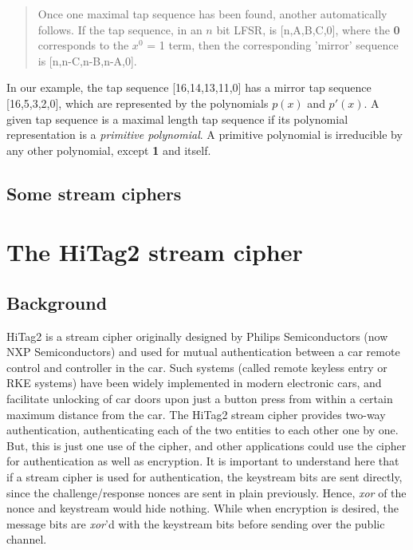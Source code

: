 \begin{quote}
Once one maximal tap sequence has been found, another automatically follows. If the tap sequence, in an $n$ bit LFSR, is [n,A,B,C,0], where the \textbf{0} corresponds to the $x^0$ = 1 term, then the corresponding 'mirror' sequence is [n,n-C,n-B,n-A,0].
\end{quote}

In our example, the tap sequence [16,14,13,11,0] has a mirror tap sequence [16,5,3,2,0], which are represented by the polynomials $p(x)$ and $p'(x)$. A given tap sequence is a maximal length tap sequence if its polynomial representation is a \emph{primitive polynomial}. A primitive polynomial is irreducible by any other polynomial, except \textbf{1} and itself. 

\subsection{Some stream ciphers}

\section{The HiTag2 stream cipher}
\label{sec:hitag2}

\subsection{Background}
\label{sec:hitag2-background}
HiTag2 is a stream cipher originally designed by Philips Semiconductors (now NXP Semiconductors) and used for mutual authentication between a car remote control and controller in the car. Such systems (called remote keyless entry or RKE systems) have been widely implemented in modern electronic cars, and facilitate unlocking of car doors upon just a button press from within a certain maximum distance from the car. The HiTag2 stream cipher provides two-way authentication, authenticating each of the two entities to each other one by one. But, this is just one use of the cipher, and other applications could use the cipher for authentication as well as encryption. It is important to understand here that if a stream cipher is used for authentication, the keystream bits are sent directly, since the challenge/response nonces are sent in plain previously. Hence, \emph{xor} of the nonce and keystream would hide nothing. While when encryption is desired, the message bits are \emph{xor}'d with the keystream bits before sending over the public channel. 

